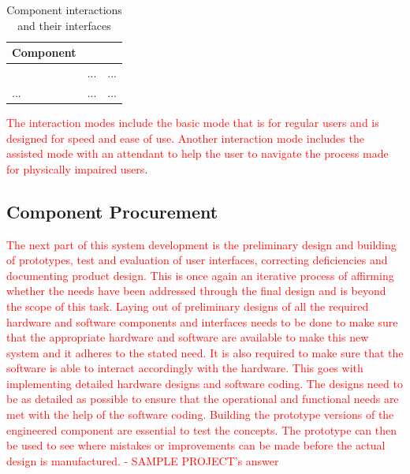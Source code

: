 \documentclass[a4paper,11pt,fleqn]{report}
\begin{document}
{%
\begin{table}[h!]
\caption {Component interactions and their interfaces} \label{tb: Components & interfaces} 
\begin{center}
\begin{tabular}{p{4cm}|p{4cm}|p{4cm}}\toprule
	{\textbf{Component}} & {\textbf{Interaction} & {\textbf{Interface}\\ \midrule
    \textcolor{Format used by sample project} & ... & ...\\
    \hline
    ... & ... & ...\\

    \bottomrule
\end{tabular}
\end{center}
\end{table}
%
\textcolor{red}{The interaction modes include the basic mode that is for regular users and is designed for speed and ease of use. Another interaction mode includes the assisted mode with an attendant to help the user to navigate the process made for physically impaired users}.

\subsection{Component Procurement}
\textcolor{red}{The next part of this system development is the preliminary design and building of prototypes, test and evaluation of user interfaces, correcting deficiencies and documenting product design. This is once again an iterative process of affirming whether the needs have been addressed through the final design and is beyond the scope of this task. Laying out of preliminary designs of all the required hardware and software components and interfaces needs to be done to make sure that the appropriate hardware and software are available to make this new system and it adheres to the stated need. It is also required to make sure that the software is able to interact accordingly with the hardware. This goes with implementing detailed hardware designs and software coding. The designs need to be as detailed as possible to ensure that the operational and functional needs are met with the help of the software coding. Building the prototype versions of the engineered component are essential to test the concepts. The prototype can then be used to see where mistakes or improvements can be made before the actual design is manufactured. - SAMPLE PROJECT's answer}

}
\end{document}
